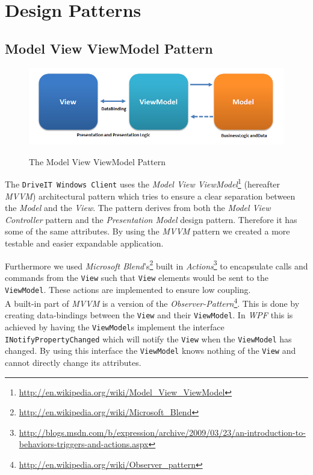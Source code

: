 \section{Design Patterns}
\subsection{Model View ViewModel Pattern}
\begin{figure}[H]
	\centering
	\includegraphics[width=\textwidth]{Figures/WebImages/MVVMPattern}\\
	\caption{The Model View ViewModel Pattern}
	\label{fig:MVVMPattern}
\end{figure}
The \texttt{DriveIT Windows Client} uses the \textit{Model View ViewModel}\footnote{\url{http://en.wikipedia.org/wiki/Model\_View\_ViewModel}} (hereafter \textit{MVVM}) architectural pattern which tries to ensure a clear separation between the \textit{Model} and the \textit{View}. The pattern derives from both the \textit{Model View Controller} pattern and the \textit{Presentation Model} design pattern. Therefore it has some of the same attributes. By using the \textit{MVVM} pattern we created a more testable and easier expandable application.

Furthermore we used \textit{Microsoft Blend}'s\footnote{\url{http://en.wikipedia.org/wiki/Microsoft_Blend}} built in \textit{Actions}\footnote{\url{http://blogs.msdn.com/b/expression/archive/2009/03/23/an-introduction-to-behaviors-triggers-and-actions.aspx}} to encapsulate calls and commands from the \texttt{View} such that \texttt{View} elements would be sent to the \texttt{ViewModel}. These actions are implemented to ensure low coupling.\\

A built-in part of \textit{MVVM} is a version of the \textit{Observer-Pattern}\footnote{\url{http://en.wikipedia.org/wiki/Observer_pattern}}. This is done by creating data-bindings between the \texttt{View} and their \texttt{ViewModel}. In \textit{WPF} this is achieved by having the \texttt{ViewModel}s implement the interface \texttt{INotifyPropertyChanged} which will notify the \texttt{View} when the \texttt{ViewModel} has changed. By using this interface the \texttt{ViewModel} knows nothing of the \texttt{View} and cannot directly change its attributes.

